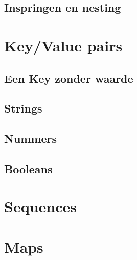 \documentclass[a4paper,12pt,twoside,openright,titlepage]{book}
\begin{document}
\section{Inspringen en nesting}


\chapter{Key/Value pairs}

\section{Een Key zonder waarde}

\section{Strings}

\section{Nummers}

\section{Booleans}


\chapter{Sequences}


\chapter{Maps}


\printindex
\end{document}
